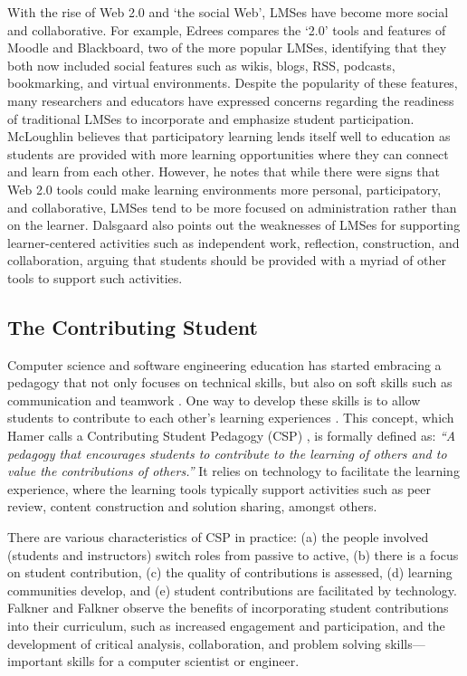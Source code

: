 With the rise of Web 2.0 and `the social Web', LMSes have become more social and collaborative. For example, Edrees \cite{edrees2013elearning} compares the `2.0' tools and features of Moodle and Blackboard, two of the more popular LMSes, identifying that they both now included social features such as wikis, blogs, RSS, podcasts, bookmarking, and virtual environments. Despite the popularity of these features, many researchers and educators have expressed concerns regarding the readiness of traditional LMSes to incorporate and emphasize student participation. McLoughlin \cite{mcloughlin2007social} believes that participatory learning lends itself well to education as students are provided with more learning opportunities where they can connect and learn from each other. However, he notes that while there were signs that Web 2.0 tools could make learning environments more personal, participatory, and collaborative, LMSes tend to be more focused on administration rather than on the learner. Dalsgaard \cite{dalsgaard2006social} also points out the weaknesses of LMSes for supporting learner-centered activities such as independent work, reflection, construction, and collaboration, arguing that students should be provided with a myriad of other tools to support such activities.

\subsection{The Contributing Student}
Computer science and software engineering education has started embracing a pedagogy that not only focuses on technical skills, but also on soft skills such as communication and teamwork \cite{jazayeri2004education}. One way to develop these skills is to allow students to contribute to each other's learning experiences \cite{hamer2006some}. This concept, which Hamer calls a Contributing Student Pedagogy (CSP) \cite{hamer2008contributing}, is formally defined as: \textit{``A pedagogy that encourages students to contribute to the learning of others and to value the contributions of others.''} It relies on technology to facilitate the learning experience, where the learning tools typically support activities such as peer review, content construction and solution sharing, amongst others.

There are various characteristics of CSP in practice: (a) the people involved (students and instructors) switch roles from passive to active, (b) there is a focus on student contribution, (c) the quality of contributions is assessed, (d) learning communities develop, and (e) student contributions are facilitated by technology. Falkner and Falkner \cite{falkner2012supporting} observe the benefits of incorporating student contributions into their curriculum, such as increased engagement and participation, and the development of critical analysis, collaboration, and problem solving skills---important skills for a computer scientist or engineer.

